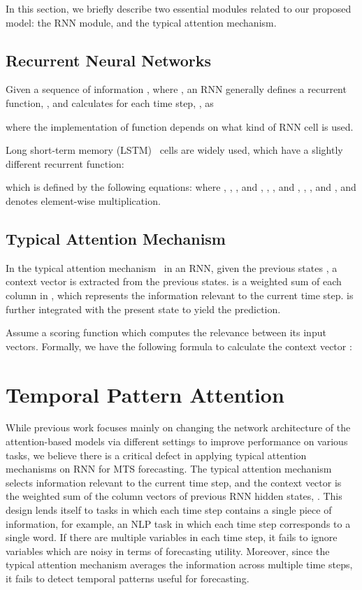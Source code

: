 In this section, we briefly describe two essential modules related to our proposed model: the RNN module, and the typical attention mechanism.

\subsection{Recurrent Neural Networks}
Given a sequence of information , where , an RNN generally defines a recurrent function, , and calculates  for each time step, , as

where the implementation of 
function    depends on what kind of RNN cell is used.

Long short-term memory (LSTM)~\cite{lstm} cells are widely used, which have a slightly different recurrent function:

which is defined by the following equations:
 where
, , , and ,
, ,  and ,
, ,  and ,
and  denotes element-wise multiplication.

\subsection{Typical Attention Mechanism}

In the typical attention mechanism~\cite{luong,bahdanau} in an RNN, given the previous states , a context vector  is extracted from the previous states.
 is a weighted sum of each column  in , which represents 
the information relevant to the current time step.
 is further integrated with the present state  to yield the prediction.

Assume a scoring function  which computes the relevance between its input vectors.
Formally, we have the following formula to calculate the context vector :




\section{Temporal Pattern Attention}\label{sec:temporal_pattern_attention}

While previous work focuses mainly on changing the network architecture of the attention-based models via different settings to improve performance on various tasks, we believe there is a critical defect in applying typical attention mechanisms on RNN for MTS forecasting. 
The typical attention mechanism selects information relevant to the current time step, and the context vector  is the weighted sum of the column vectors of previous RNN hidden states, . 
This design lends itself to tasks in which each time step contains a single piece of information, for example, an NLP task in which each time step corresponds to a single word.
If there are multiple variables in each time step, it fails to ignore 
variables which are noisy in terms of forecasting utility.
Moreover, since the typical attention mechanism averages the information across multiple time steps, it fails to detect temporal patterns useful for forecasting.


